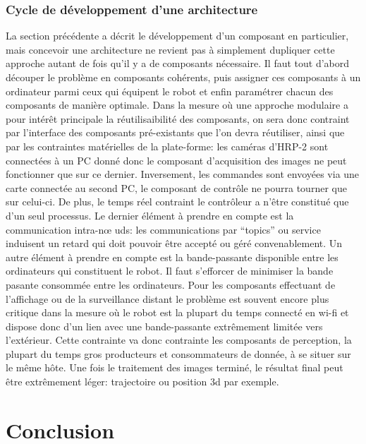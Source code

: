 \subsubsection{Cycle de développement d'une architecture}


La section précédente a décrit le développement d'un composant en
particulier, mais concevoir une architecture ne revient pas à
simplement dupliquer cette approche autant de fois qu'il y a de
composants nécessaire. Il faut tout d'abord découper le problème en
composants cohérents, puis assigner ces composants à un ordinateur
parmi ceux qui équipent le robot et enfin paramétrer chacun des
composants de manière optimale. Dans la mesure où une approche
modulaire a pour intérêt principale la réutilisaibilité des
composants, on sera donc contraint par l'interface des composants
pré-existants que l'on devra réutiliser, ainsi que par les contraintes
matérielles de la plate-forme: les caméras d'HRP-2 sont connectées à
un PC donné donc le composant d'acquisition des images ne peut
fonctionner que sur ce dernier. Inversement, les commandes sont
envoyées via une carte connectée au second PC, le composant de
contrôle ne pourra tourner que sur celui-ci. De plus, le temps réel
contraint le contrôleur a n'être constitué que d'un seul processus. Le
dernier élément à prendre en compte est la communication intra-n\oe
uds: les communications par ``topics'' ou service induisent un retard
qui doit pouvoir être accepté ou géré convenablement. Un autre élément
à prendre en compte est la bande-passante disponible entre les
ordinateurs qui constituent le robot. Il faut s'efforcer de minimiser
la bande pasante consommée entre les ordinateurs. Pour les composants
effectuant de l'affichage ou de la surveillance distant le problème
est souvent encore plus critique dans la mesure où le robot est la
plupart du temps connecté en wi-fi et dispose donc d'un lien avec une
bande-passante extrêmement limitée vers l'extérieur. Cette contrainte
va donc contrainte les composants de perception, la plupart du temps
gros producteurs et consommateurs de donnée, à se situer sur le même
hôte. Une fois le traitement des images terminé, le résultat final
peut être extrêmement léger: trajectoire ou position 3d par exemple.



\section{Conclusion}


